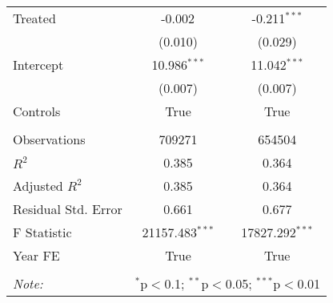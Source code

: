 \begin{tabular}{@{\extracolsep{5pt}}lcc}
 Treated & -0.002$^{}$ & -0.211$^{***}$ \\
& (0.010) & (0.029) \\
 Intercept & 10.986$^{***}$ & 11.042$^{***}$ \\
& (0.007) & (0.007) \\
 Controls & True & True \\
 \hline \\[-1.8ex]
 Observations & 709271 & 654504 \\
 $R^2$ & 0.385 & 0.364 \\
 Adjusted $R^2$ & 0.385 & 0.364 \\
 Residual Std. Error & 0.661  & 0.677  \\
 F Statistic & 21157.483$^{***}$  & 17827.292$^{***}$  \\
    Year FE & True & True \\
\hline
\hline \\[-1.8ex]
\textit{Note:} & \multicolumn{2}{r}{$^{*}$p$<$0.1; $^{**}$p$<$0.05; $^{***}$p$<$0.01} \\
\end{tabular}
